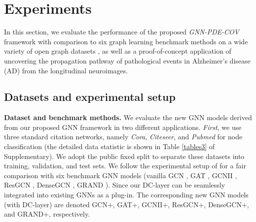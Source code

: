 \documentclass{article}
\begin{document}



\section{Experiments}
In this section, we evaluate the performance of the proposed \textit{GNN-PDE-COV} framework with comparison to six graph learning benchmark methods on a wide variety of open graph datasets \cite{sen2008collective}, as well as a proof-of-concept application of uncovering the propagation pathway of pathological events in Alzheimer's disease (AD) from the longitudinal neuroimages.

 \subsection{Datasets and experimental setup}

 \textbf{Dataset and benchmark methods.} We evaluate the new GNN models derived from our proposed GNN framework in two different applications. \textit{First}, we use three standard citation networks, namely \textit{Cora}, \textit{Citeseer}, and \textit{Pubmed} \cite{sen2008collective} for node classification (the detailed data statistic is shown in Table \ref{tables3} of Supplementary). We adopt the public fixed split \cite{yang2016revisiting} to separate these datasets into training, validation, and test sets. We follow the experimental setup of \cite{chen2020simple} for a fair comparison with six benchmark GNN models (vanilla GCN \cite{kipf2016semi}, GAT \cite{velivckovic2017graph}, GCNII \cite{chen2020simple}, ResGCN \cite{li2019deepgcns}, DenseGCN \cite{li2019deepgcns}, GRAND \cite{chamberlain2021grand}). Since our DC-layer can be seamlessly integrated into existing GNNs as a plug-in. The corresponding new GNN models (with DC-layer) are denoted GCN+, GAT+, GCNII+, ResGCN+, DenseGCN+, and GRAND+, respectively.
\end{document}
